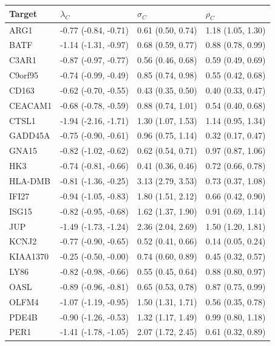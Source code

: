 \documentclass[../thesis.tex]{subfiles}
\begin{document}
\begin{table}[!t]
\centering
 {\begin{tabular}{|l|lll|}
\hline
Target &  $\lambda_C$ & $\sigma_C$ & $\rho_C$  \\
\hline
ARG1 &  -0.77 (-0.84,  -0.71) & 0.61 (0.50,  0.74) & 1.18 (1.05,  1.30) \\ 
BATF  &  -1.14 (-1.31,  -0.97) & 0.68 (0.59,  0.77) & 0.88 (0.78,  0.99) \\ 
C3AR1  &  -0.87 (-0.97,  -0.77) & 0.56 (0.46,  0.68) & 0.59 (0.49,  0.69) \\ 
C9orf95 &  -0.74 (-0.99,  -0.49) & 0.85 (0.74,  0.98) & 0.55 (0.42,  0.68) \\  
CD163 &  -0.62 (-0.70,  -0.55) & 0.43 (0.35,  0.50) & 0.40 (0.33,  0.47) \\ 
CEACAM1 &  -0.68 (-0.78,  -0.59) & 0.88 (0.74,  1.01) & 0.54 (0.40, 0.68) \\ 
CTSL1 &  -1.94 (-2.16,  -1.71) & 1.30 (1.07,  1.53) & 1.14 (0.95,  1.34) \\ 
GADD45A &  -0.75 (-0.90,  -0.61) & 0.96 (0.75,  1.14) & 0.32 (0.17,  0.47) \\ 
GNA15 &  -0.82 (-1.02,  -0.62) & 0.62 (0.54,  0.71) & 0.97 (0.87,  1.06) \\ 
HK3 &  -0.74 (-0.81,  -0.66) & 0.41 (0.36,  0.46) & 0.72 (0.66, 0.78) \\ 
HLA-DMB &  -0.81 (-1.36,  -0.25) & 3.13 (2.79,  3.53) & 0.73 (0.37, 1.08) \\ 
IFI27 &  -0.94 (-1.05, -0.83) & 1.80 (1.51,  2.12) & 0.66 (0.42,  0.90) \\ 
ISG15 &  -0.82 (-0.95,  -0.68) & 1.62 (1.37,  1.90) & 0.91 (0.69, 1.14) \\ 
JUP &  -1.49 (-1.73,  -1.24) & 2.36 (2.04,  2.69) & 1.50 (1.20,  1.81) \\ 
KCNJ2 &  -0.77 (-0.90,  -0.65) & 0.52 (0.41,  0.66) & 0.14 (0.05, 0.24) \\ 
KIAA1370 &  -0.25 (-0.50,  -0.00) & 0.74 (0.60,  0.89) & 0.45 (0.32,  0.57) \\ 
LY86 &  -0.82 (-0.98,  -0.66) & 0.55 (0.45,  0.64) & 0.88 (0.80, 0.97) \\ 
OASL &  -0.89 (-0.96,  -0.81) & 0.65 (0.53,  0.78) & 0.87 (0.75, 0.99) \\ 
OLFM4 &  -1.07 (-1.19,  -0.95) & 1.50 (1.31,  1.71) & 0.56 (0.35,  0.78) \\ 
PDE4B &  -0.90 (-1.26,  -0.53) & 1.32 (1.17,  1.49) & 0.99 (0.80,  1.18) \\ 
PER1 &  -1.41 (-1.78,  -1.05) & 2.07 (1.72,  2.45) & 0.61 (0.32,  0.89) \\ 

\end{tabular}}
\end{table}
\end{document}
